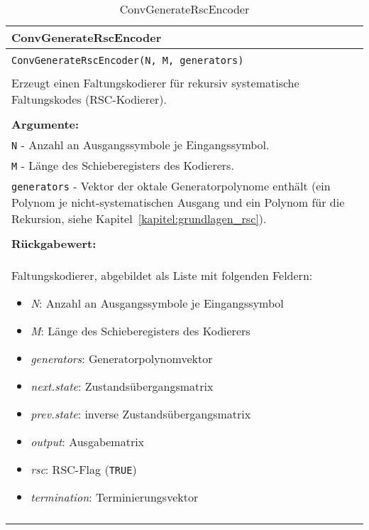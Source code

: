 \begin{longtable}{|p{\textwidth}|}
\hline
\rowcolor{lightblue}
ConvGenerateRscEncoder
\\
\hline
\\
\texttt{ConvGenerateRscEncoder(N, M, generators)}\\
\\
Erzeugt einen Faltungskodierer für rekursiv systematische Faltungskodes (RSC-Kodierer).\\
\\
\textbf{Argumente:}\\
\texttt{N} - Anzahl an Ausgangssymbole je Eingangssymbol.\\
\texttt{M} - Länge des Schieberegisters des Kodierers.\\
\texttt{generators} - Vektor der oktale Generatorpolynome enthält (ein Polynom je nicht-systematischen Ausgang und ein Polynom für die Rekursion, siehe Kapitel~\ref{kapitel:grundlagen_rsc}).\\
\\
\textbf{Rückgabewert:}\\
Faltungskodierer, abgebildet als Liste mit folgenden Feldern:
\vspace{-4mm}
\begin{itemize}
\renewcommand\labelitemi{--}
\itemsep-.5em %
\item \emph{N}: Anzahl an Ausgangssymbole je Eingangssymbol
\item \emph{M}: Länge des Schieberegisters des Kodierers
\item \emph{generators}: Generatorpolynomvektor
\item \emph{next.state}: Zustandsübergangsmatrix
\item \emph{prev.state}: inverse Zustandsübergangsmatrix
\item \emph{output}: Ausgabematrix
\item \emph{rsc}: RSC-Flag (\texttt{TRUE})
\item \emph{termination}: Terminierungsvektor
\end{itemize}
\\
\hline
\caption{ConvGenerateRscEncoder}
\end{longtable}